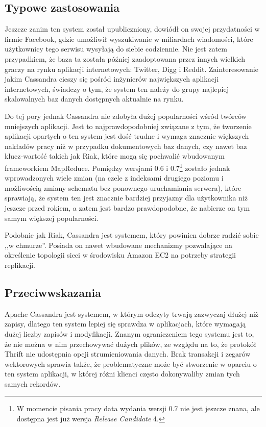 \subsection*{Typowe zastosowania}

Jeszcze zanim ten system został upubliczniony, dowiódł on swojej przydatności w firmie Facebook, gdzie umożliwił wyszukiwanie w miliardach wiadomości, które użytkownicy tego serwisu wysyłają do siebie codziennie.
Nie jest zatem przypadkiem, że baza ta została później zaadoptowana przez innych wielkich graczy na rynku aplikacji internetowych: Twitter, Digg i Reddit.
Zainteresowanie jakim Cassandra cieszy się pośród inżynierów największych aplikacji internetowych, świadczy o tym, że system ten należy do grupy najlepiej skalowalnych baz danych dostępnych aktualnie na rynku.

Do tej pory jednak Cassandra nie zdobyła dużej popularności wśród twórców mniejszych aplikacji.
Jest to najprawdopodobniej związane z tym, że tworzenie aplikacji opartych o ten system jest dość trudne i wymaga znacznie większych nakładów pracy niż w przypadku dokumentowych baz danych, czy nawet baz klucz-wartość takich jak Riak, które mogą się pochwalić wbudowanym frameworkiem MapReduce. 
Pomiędzy wersjami 0.6 i 0.7\footnote{W momencie pisania pracy data wydania wersji 0.7 nie jest jeszcze znana, ale dostępna jest już wersja \emph{Release Candidate} 4.} zostało jednak wprowadzonych wiele zmian (na czele z indeksami drugiego poziomu i możliwością zmiany schematu bez ponownego uruchamiania serwera), które sprawiają, że system ten jest znacznie bardziej przyjazny dla użytkownika niż jeszcze przed rokiem, a zatem jest bardzo prawdopodobne, że nabierze on tym samym większej popularności.

Podobnie jak Riak, Cassandra jest systemem, który powinien dobrze radzić sobie ,,w chmurze''.
Posiada on nawet wbudowane mechanizmy pozwalające na określenie topologii sieci w środowisku Amazon EC2 na potrzeby strategii replikacji.

\subsection*{Przeciwwskazania}

Apache Cassandra jest systemem, w którym odczyty trwają zazwyczaj dłużej niż zapisy, dlatego ten system lepiej się sprawdza w aplikacjach, które wymagają dużej liczby zapisów i modyfikacji.
Znanym ograniczeniem tego systemu jest to, że nie można w nim przechowywać dużych plików, ze względu na to, że protokół Thrift nie udostępnia opcji strumieniowania danych.
Brak transakcji i zegarów wektorowych sprawia także, że problematyczne może być stworzenie w oparciu o ten system aplikacji, w której różni klienci często dokonywaliby zmian tych samych rekordów. 

